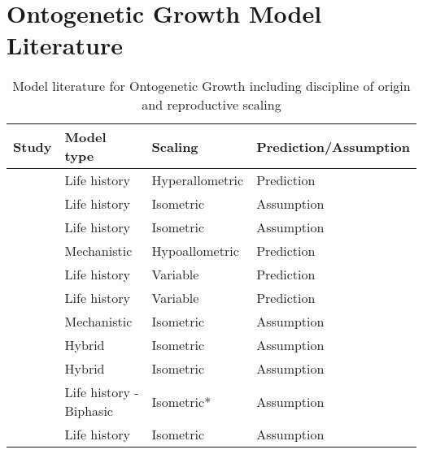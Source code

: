 \documentclass[a4paper]{article} %
\begin{document}
\newpage
\section{Ontogenetic Growth Model Literature}

\begin{table}[H]
    \caption{Model literature for Ontogenetic Growth including discipline of origin and reproductive scaling}
    \begin{tabular}{|l|l|l|l|}
    \hline
    \textbf{Study}                          & \textbf{Model type}       & \textbf{Scaling} & \textbf{Prediction/Assumption} \\ \hline
    \autocite{Gadgil1970}                   & Life history              & Hyperallometric  & Prediction                     \\ \hline
    \autocite{Roff1983}                     & Life history              & Isometric        & Assumption                     \\ \hline
    \autocite{Roff1984}                     & Life history              & Isometric        & Assumption                     \\ \hline
    \autocite{Reiss1985}                    & Mechanistic               & Hypoallometric   & Prediction                     \\ \hline
    \autocite{Kozowski1987-indeterminate}   & Life history              & Variable         & Prediction                     \\ \hline
    \autocite{kozlowski1996}                & Life history              & Variable         & Prediction                     \\ \hline
    \autocite{West2001}                     & Mechanistic               & Isometric        & Assumption                     \\ \hline
    \autocite{Charnov2001}                  & Hybrid                    & Isometric        & Assumption                     \\ \hline
    \autocite{Charnov2002}                  & Hybrid                    & Isometric        & Assumption                     \\ \hline
    \autocite{Lester2004}                   & Life history - Biphasic   & Isometric*       & Assumption                     \\ \hline
    \autocite{Roff2006}                     & Life history              & Isometric        & Assumption                     \\ \hline

\end{tabular}
\end{table}
\end{document}
